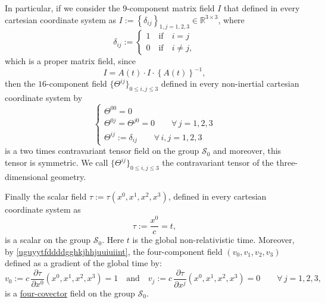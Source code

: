 \documentclass{article}
\theoremstyle{definition}
\theoremstyle{remark}
\newcommand{\R}{\mathbb{R}}
\newcommand{\er}{\eqref}
\newcommand{\R}{{\mathbb{R}}}
\newcommand{\er}{\eqref}
\begin{document}
In particular, if we consider the $9$-component matrix field $I$
that defined in every cartesian coordinate system as
$I:=\left\{\delta_{ij}\right\}_{1,j=1,2,3}\in \R^{3\times 3}$, where
\begin{equation}\label{huohuioy89gjjhjffffff3478zzrrZZZhjhhjhhjjhhffGGhjjhuiiuihhjkklpklint}
\delta_{ij}:=
\begin{cases}
1\quad\text{if}\quad i=j
\\
0\quad\text{if}\quad i\neq j,
\end{cases}
\end{equation}
which is a proper matrix field, since
\begin{equation}\label{uguyytfddddgghjjghjjjihohjjkkkookint}
I=A(t)\cdot I\cdot \left\{A(t)\right\}^{-1},
\end{equation}
then the $16$-component field $\{{\Theta}^{ij}\}_{0\leq i,j\leq 3}$
defined in every non-inertial cartesian coordinate system by
\begin{equation}\label{huohuioy89gjjhjffffff3478zzrrZZZhjhhjhhjjhhffGGhjjhuiiuihhjkkoioiint}
\begin{cases}
{\Theta}^{00}=0
\\
{\Theta}^{0j}={\Theta}^{j0}=0\quad\quad\forall\, j=1,2,3
\\
{\Theta}^{ij}:=\delta_{ij}\quad\quad\forall\, i,j=1,2,3
\end{cases}
\end{equation}
is a two times contravariant tensor field on the group
$\mathcal{S}_0$ and moreover, this tensor is symmetric. We call
$\{{\Theta}^{ij}\}_{0\leq i,j\leq 3}$ the contravariant tensor of
the three-dimensional geometry.

Finally the scalar field $\tau:=\tau(x^0,x^1,x^2,x^3)$, defined in
every cartesian coordinate system as
\begin{equation}\label{uguyytfddddgghkjhhjuuiuiint}
\tau:=\frac{x^0}{c}=t,
\end{equation}
is a scalar on the group $\mathcal{S}_0$. Here $t$ is the global
non-relativistic time. Moreover,
by \er{uguyytfddddgghkjhhjuuiuiint}, the four-component field
$(v_0,v_1,v_2,v_3)$ defined as a gradient of the global time by:
\begin{equation}\label{fgjfjhgghhgjghjhjkkkkgjghghuiiiulkkjlkklplikklkjljghhgghkint}
v_0:=c\,\frac{\partial \tau}{\partial
x^0}(x^0,x^1,x^2,x^3)=1\quad\text{and}\quad v_j:=c\,\frac{\partial
\tau}{\partial x^j}(x^0,x^1,x^2,x^3)=0\quad\quad\forall\,j=1,2,3,
\end{equation}
is a \underline{four-covector} field on the group $\mathcal{S}_0$.
\end{document}
